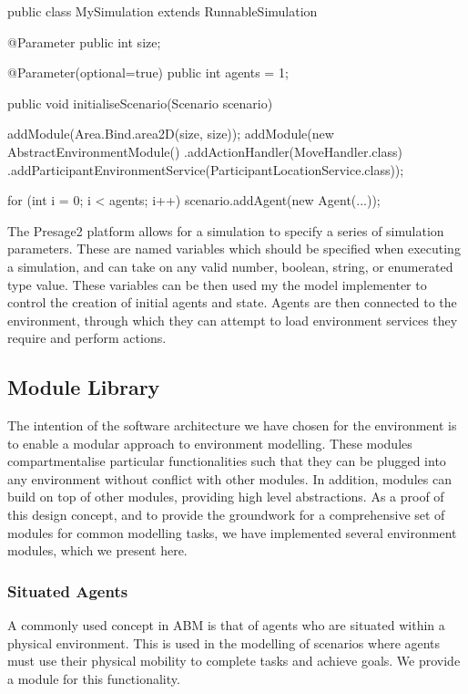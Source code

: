 \begin{java}[caption={Specification of a simulation and parameters in Presage2},label=alg:simspec]
public class MySimulation extends RunnableSimulation {
	@Parameter
	public int size;

	@Parameter(optional=true)
	public int agents = 1;

	public void initialiseScenario(Scenario scenario) {
		addModule(Area.Bind.area2D(size, size));
		addModule(new AbstractEnvironmentModule()
			.addActionHandler(MoveHandler.class)
			.addParticipantEnvironmentService(ParticipantLocationService.class));

		for (int i = 0; i < agents; i++) {
			scenario.addAgent(new Agent(...));
		}
	}
}
\end{java}

The Presage2 platform allows for a simulation to specify a series of simulation
parameters. These are named variables which should be specified when executing a
simulation, and can take on any valid number, boolean, string, or enumerated
type value. These variables can be then used my the model implementer to control
the creation of initial agents and state. Agents are then connected to the
environment, through which they can attempt to load environment services they
require and perform actions.

\subsection{Module Library}

The intention of the software architecture we have chosen for the environment is
to enable a modular approach to environment modelling. These modules
compartmentalise particular functionalities such that they can be plugged into
any environment without conflict with other modules. In addition, modules
can build on top of other modules, providing high level abstractions. As a proof
of this design concept, and to provide the groundwork for a comprehensive set of
modules for common modelling tasks, we have implemented several environment
modules, which we present here.

\subsubsection*{Situated Agents}

A commonly used concept in \ac{ABM} is that of agents who are situated within a
physical environment. This is used in the modelling of scenarios where agents
must use their physical mobility to complete tasks and achieve goals. We provide
a module for this functionality.

